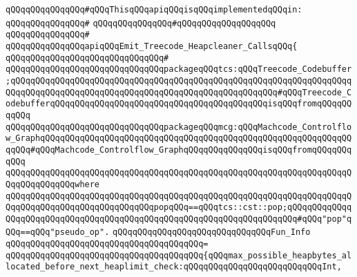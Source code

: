 \newline
\verb|qQQqqQQqqQQqqQQq#qQQqThisqQQqapiqQQqisqQQqimplementedqQQqin:|\newline
\verb|qQQqqQQqqQQqqQQq#|\newline
\verb|qQQqqQQqqQQqqQQq#qQQqqQQqqQQqqQQqqQQq|\newline
\verb|qQQqqQQqqQQqqQQq#|\newline
\verb|qQQqqQQqqQQqqQQqapiqQQqEmit_Treecode_Heapcleaner_CallsqQQq{|\newline
\verb|qQQqqQQqqQQqqQQqqQQqqQQqqQQqqQQq#|\newline
\verb|qQQqqQQqqQQqqQQqqQQqqQQqqQQqqQQqpackageqQQqtcs:qQQqTreecode_Codebuffer;qQQqqQQqqQQqqQQqqQQqqQQqqQQqqQQqqQQqqQQqqQQqqQQqqQQqqQQqqQQqqQQqqQQqqQQqqQQqqQQqqQQqqQQqqQQqqQQqqQQqqQQqqQQqqQQqqQQqqQQqqQQq#qQQqTreecode_CodebufferqQQqqQQqqQQqqQQqqQQqqQQqqQQqqQQqqQQqqQQqqQQqisqQQqfromqQQqqQQqqQQq|\newline
\newline
\verb|qQQqqQQqqQQqqQQqqQQqqQQqqQQqqQQqpackageqQQqmcg:qQQqMachcode_Controlflow_GraphqQQqqQQqqQQqqQQqqQQqqQQqqQQqqQQqqQQqqQQqqQQqqQQqqQQqqQQqqQQqqQQqqQQq#qQQqMachcode_Controlflow_GraphqQQqqQQqqQQqqQQqisqQQqfromqQQqqQQqqQQq|\newline
\verb|qQQqqQQqqQQqqQQqqQQqqQQqqQQqqQQqqQQqqQQqqQQqqQQqqQQqqQQqqQQqqQQqqQQqqQQqqQQqqQQqqQQqwhere|\newline
\verb|qQQqqQQqqQQqqQQqqQQqqQQqqQQqqQQqqQQqqQQqqQQqqQQqqQQqqQQqqQQqqQQqqQQqqQQqqQQqqQQqqQQqqQQqqQQqqQQqqQQqpopqQQq==qQQqtcs::cst::pop;qQQqqQQqqQQqqQQqqQQqqQQqqQQqqQQqqQQqqQQqqQQqqQQqqQQqqQQqqQQqqQQqqQQqqQQq#qQQq"pop"qQQq==qQQq"pseudo_op".|\newline
\newline
\newline
\verb|qQQqqQQqqQQqqQQqqQQqqQQqqQQqqQQqFun_Info|\newline
\verb|qQQqqQQqqQQqqQQqqQQqqQQqqQQqqQQqqQQqqQQq=|\newline
\verb|qQQqqQQqqQQqqQQqqQQqqQQqqQQqqQQqqQQqqQQq{qQQqmax_possible_heapbytes_allocated_before_next_heaplimit_check:qQQqqQQqqQQqqQQqqQQqqQQqqQQqInt,|\newline
